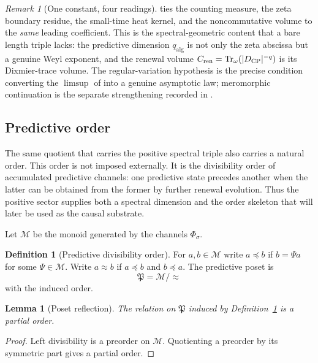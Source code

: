 \documentclass[11pt]{article}
\newtheorem{lemma}[theorem]{Lemma}
\theoremstyle{definition}
\newtheorem{definition}[theorem]{Definition}
\theoremstyle{remark}
\newtheorem{remark}[theorem]{Remark}
\newcommand{\Pp}{\mathfrak{P}}
\newcommand{\M}{\mathcal{M}}
\newcommand{\CP}{\mathrm{CP}}
\newcommand{\qalg}{q_{\mathrm{alg}}}
\newcommand{\Tr}{\operatorname{Tr}}
\begin{document}
\begin{remark}[One constant, four readings]
\label{rem:weyl-one-constant}
 ties the counting measure, the zeta boundary residue, the
small-time heat kernel, and the noncommutative volume to the \emph{same} leading
coefficient.  This is the spectral-geometric content that a bare length triple
lacks: the predictive dimension $\qalg$ is not only the zeta abscissa but a
genuine Weyl exponent, and the renewal volume
$C_{\rm ren}=\Tr_\omega(|D_{\CP}|^{-q})$ is its Dixmier-trace volume.  The
regular-variation hypothesis  is the precise
condition converting the $\limsup$ of  into a genuine asymptotic law; meromorphic continuation is the separate strengthening recorded in
.
\end{remark}



\subsection{Predictive order}

\label{sec:order}

The same quotient that carries the positive spectral triple also carries a
natural order.  This order is not imposed externally.  It is the divisibility
order of accumulated predictive channels: one predictive state precedes another
when the latter can be obtained from the former by further renewal evolution.
Thus the positive sector supplies both a spectral dimension and the order
skeleton that will later be used as the causal substrate.

Let $\M$ be the monoid generated by the channels $\Phi_\sigma$.

\begin{definition}[Predictive divisibility order]
\label{def:predictive-order}
For $a,b\in\M$ write $a\preceq b$ if $b=\Psi a$ for some $\Psi\in\M$.  Write $a\approx b$ if $a\preceq b$ and $b\preceq a$.  The predictive poset is
\[
 \Pp=\M/{\approx}
\]
with the induced order.
\end{definition}

\begin{lemma}[Poset reflection]
\label{lem:poset}
The relation on $\Pp$ induced by Definition~\ref{def:predictive-order} is a partial order.
\end{lemma}

\begin{proof}
Left divisibility is a preorder on $\M$.  Quotienting a preorder by its symmetric part gives a partial order.
\end{proof}
\end{document}
